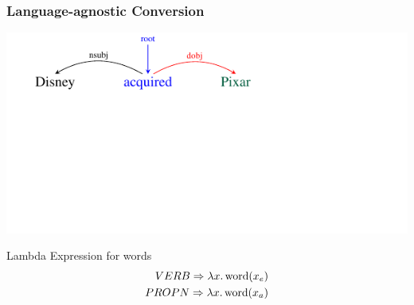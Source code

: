 \documentclass[mathserif,12pt]{beamer}
\newcommand{\lspace}{.\,}
\begin{document}
\begin{frame}
\frametitle{Language-agnostic Conversion}
\vspace{-2.4em}
\begin{center}
\includegraphics[trim=2em 9.4em 10em 0em,clip=true,scale=1.3]{figures/pixar_dobj}

\end{center}

\vspace{1cm}

\begin{block}{\centering Lambda Expression for words}
\vspace{-0.5cm}
\begin{align*}
  VERB \Rightarrow \lambda x \lspace \hbox{word}(x_e) \\
  PROPN \Rightarrow \lambda x \lspace \hbox{word}(x_a) 
\end{align*}
\vspace{-0.5cm}
\end{block}
\end{frame}
\end{document}
